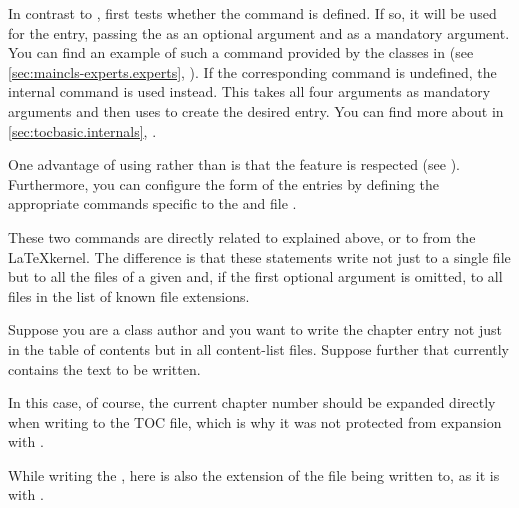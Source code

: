 In contrast to ,  first tests
whether the  command is defined.
If so, it will be used for the entry, passing the  as an
optional argument and  as a mandatory argument. You can find an
example of such a command provided by the \KOMAScript{} classes in
 (see
\autoref{sec:maincls-experts.experts},
). If the corresponding
command is undefined, the internal command
 is used instead. This takes
all four arguments as mandatory arguments and then uses
 to create the desired entry. You can find more about
 in
\autoref{sec:tocbasic.internals},
.

One advantage of using  rather than
 is that the  feature is respected
(see ). Furthermore, you can configure
the form of the entries by defining the appropriate commands specific to the
 and file .%
%
\EndIndexGroup


\begin{Declaration}
\end{Declaration}
These two commands are directly related to
explained above, or to  from the \LaTeX kernel. The
difference is that these statements write  not just to a single
file but to all the files of a given  and, if the first optional
argument is omitted, to all files in the list of known file extensions.
\begin{Example}
  Suppose you are a class author and you want to write the chapter entry not
  just in the table of contents but in all content-list files. Suppose further
  that  currently contains the text to be written.
  In this case, of course, the current chapter number should be expanded
  directly when writing to the TOC file, which is why it was not protected
  from expansion with .
\end{Example}
While writing the ,
 here is also
the extension of the file being written to, as it is with
.%

